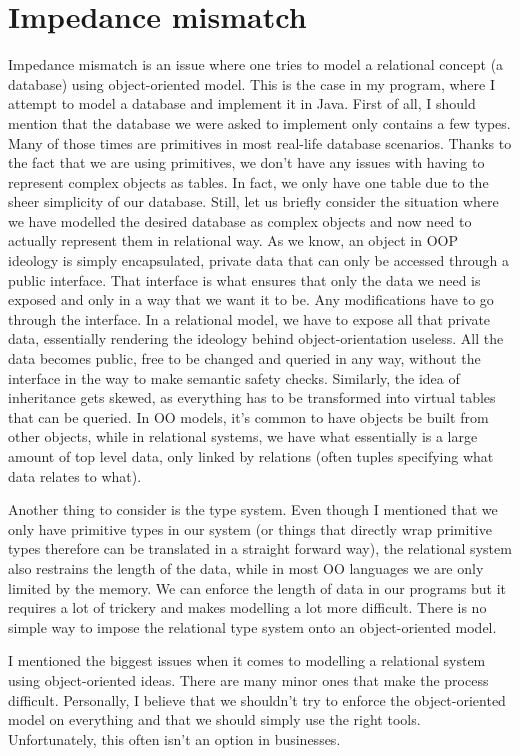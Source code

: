 \documentclass{report}
\begin{document}
\section*{Impedance mismatch}
Impedance mismatch is an issue where one tries to model a relational concept (a database) using object-oriented model. This is the case in my program, where I attempt to model a database and implement it in Java. First of all, I should mention that the database we were asked to implement only contains a few types. Many of those times are primitives in most real-life database scenarios. Thanks to the fact that we are using primitives, we don't have any issues with having to represent complex objects as tables. In fact, we only have one table due to the sheer simplicity of our database. Still, let us briefly consider the situation where we have modelled the desired database as complex objects and now need to actually represent them in relational way. As we know, an object in OOP ideology is simply encapsulated, private data that can only be accessed through a public interface. That interface is what ensures that only the data we need is exposed and only in a way that we want it to be. Any modifications have to go through the interface. In a relational model, we have to expose all that private data, essentially rendering the ideology behind object-orientation useless. All the data becomes public, free to be changed and queried in any way, without the interface in the way to make semantic safety checks. Similarly, the idea of inheritance gets skewed, as everything has to be transformed into virtual tables that can be queried. In OO models, it's common to have objects be built from other objects, while in relational systems, we have what essentially is a large amount of top level data, only linked by relations (often tuples specifying what data relates to what).

Another thing to consider is the type system. Even though I mentioned that we only have primitive types in our system (or things that directly wrap primitive types therefore can be translated in a straight forward way), the relational system also restrains the length of the data, while in most OO languages we are only limited by the memory. We can enforce the length of data in our programs but it requires a lot of trickery and makes modelling a lot more difficult. There is no simple way to impose the relational type system onto an object-oriented model.

I mentioned the biggest issues when it comes to modelling a relational system using object-oriented ideas. There are many minor ones that make the process difficult. Personally, I believe that we shouldn't try to enforce the object-oriented model on everything and that we should simply use the right tools. Unfortunately, this often isn't an option in businesses.
\end{document}
